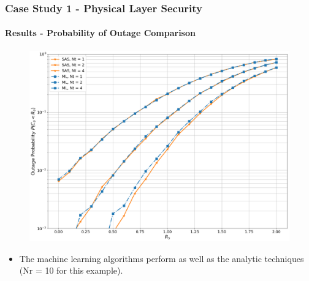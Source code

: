 \documentclass{beamer}
\begin{document}
\begin{frame}
\frametitle{Case Study 1 - Physical Layer Security}
\framesubtitle{Results - Probability of Outage Comparison}

\vspace{-3mm}
\begin{figure}
\centering
\includegraphics[width=0.7\paperwidth]{./images/outage_sas.png}
\end{figure}
    \vspace{-7mm}
    \begin{itemize}
        \item The machine learning algorithms perform as well as the analytic techniques (Nr = 10 for this example).
    \end{itemize}
\end{frame}
\end{document}
